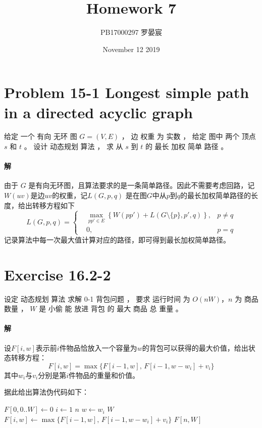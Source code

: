 \documentclass{article}
\title{Homework 7}
\author{PB17000297 罗晏宸}
\date{November 12 2019}
\begin{document}
\maketitle

\section{Problem 15-1 Longest simple path in a directed acyclic graph}
给定 一个 有向 无环 图 $G = (V,E)$ ， 边 权重 为 实数 ， 给定 图中 两个 顶点 $s$ 和 $t$ 。 设计 动态规划 算法 ， 求 从 $s$ 到 $t$ 的 最长 加权 简单 路径 。

\paragraph{解}

由于 $G$ 是有向无环图，且算法要求的是一条简单路径。因此不需要考虑回路，记$W(uv)$是边$uv$的权重，记$L(G,p,q)$ 是在图$G$中从$p$到$q$的最长加权简单路径的长度，给出转移方程如下
\begin{equation}
	L(G,p,q) =
	\left\{
	\begin{aligned}
		&\max_{pp' \in E}{ \left\{ W(pp') + L\left(G \setminus \{p\}, p',q \right) \right\} }, &p \neq q \\
		&0, &p = q
	\end{aligned}
	\right.
\end{equation}
记录算法中每一次最大值计算对应的路径，即可得到最长加权简单路径。

\section{Exercise 16.2-2}
设定 动态规划 算法 求解 0-1 背包问题 ， 要求 运行时间 为 $O(nW)$，$n$ 为 商品 数量 ， $W$ 是 小偷 能 放进 背包 的 最大 商品 总 重量 。

\paragraph{解}
设$F[i,w]$表示前$i$件物品恰放入一个容量为$w$的背包可以获得的最大价值，给出状态转移方程：
\begin{equation}
	F[i,w] = \max{\{ F[i-1,w],\,F[i-1,w-w_i] + v_i \}}
\end{equation}
其中$w_i$与$v_i$分别是第$i$件物品的重量和价值。
\par
据此给出算法伪代码如下：
\begin{codebox}
	\li $F[0, 0..W] \gets 0$
	\li \For $i \gets 1$ \To $n$
		\Do
	\li 	\For $w \gets w_i$ \To $W$
			\Do
	\li			$F[i,w] \gets \max{\{ F[i-1,w],\,F[i-1,w-w_i] + v_i \}}$
			\End
		\End
	\li \Return $F[n,W]$
\end{codebox}
\end{document}
